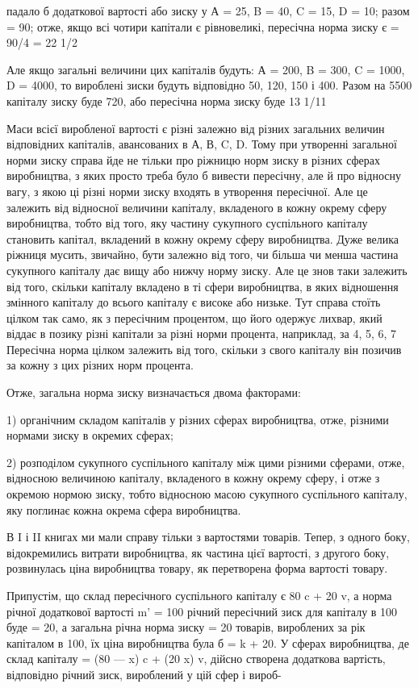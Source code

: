 падало б додаткової вартості або зиску у А = 25, B = 40, C = 15, D = 10; разом = 90; отже, якщо всі
чотири капітали є рівновеликі, пересічна норма зиску є = 90/4 = 22 1/2%

Але якщо загальні величини цих капіталів будуть: А = 200, B = 300, C = 1000, D = 4000, то вироблені
зиски будуть відповідно 50, 120, 150 і 400. Разом на 5500 капіталу зиску буде 720, або пересічна
норма зиску буде 13 1/11%

Маси всієї виробленої вартості є різні залежно від різних загальних величин відповідних капіталів,
авансованих в А, В, C, D.
Тому при утворенні загальної норми зиску справа йде не тільки
про ріжницю норм зиску в різних сферах виробництва, з яких
просто треба було б вивести пересічну, але й про відносну вагу,
з якою ці різні норми зиску входять в утворення пересічної.
Але це залежить від відносної величини капіталу, вкладеного
в кожну окрему сферу виробництва, тобто від того, яку частину
сукупного суспільного капіталу становить капітал, вкладений
в кожну окрему сферу виробництва. Дуже велика ріжниця мусить, звичайно, бути залежно від того, чи
більша чи менша
частина сукупного капіталу дає вищу або нижчу норму зиску.
Але це знов таки залежить від того, скільки капіталу вкладено
в ті сфери виробництва, в яких відношення змінного капіталу
до всього капіталу є високе або низьке. Тут справа стоїть цілком
так само, як з пересічним процентом, що його одержує лихвар,
який віддає в позику різні капітали за різні норми процента, наприклад, за 4, 5, 6, 7%
Пересічна норма цілком залежить
від того, скільки з свого капіталу він позичив за кожну з цих
різних норм процента.

Отже, загальна норма зиску визначається двома факторами:

1) органічним складом капіталів у різних сферах виробництва,
отже, різними нормами зиску в окремих сферах;

2) розподілом сукупного суспільного капіталу між цими різними сферами, отже, відносною величиною
капіталу, вкладеного
в кожну окрему сферу, і отже з окремою нормою зиску, тобто
відносною масою сукупного суспільного капіталу, яку поглинає
кожна окрема сфера виробництва.

В I і II книгах ми мали справу тільки з вартостями товарів.
Тепер, з одного боку, відокремились витрати виробництва, як
частина цієї вартості, з другого боку, розвинулась ціна виробництва товару, як перетворена форма
вартості товару.

Припустім, що склад пересічного суспільного капіталу є
80 c + 20 v, а норма річної додаткової вартості m' = 100%
річний пересічний зиск для капіталу в 100 буде = 20, а загальна
річна норма зиску = 20%
товарів, вироблених за рік капіталом в 100, їх ціна виробництва була б = k + 20. У сферах
виробництва, де склад капіталу = (80 — x) c + (20 x) v, дійсно створена додаткова вартість,
відповідно річний зиск, вироблений у цій сфер і вироб-
